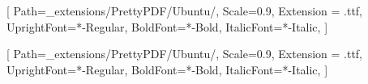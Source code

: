 \usepackage{geometry}
\usepackage{xcolor}
\usepackage{eso-pic}
\usepackage{fancyhdr, lastpage}
\usepackage{sectsty}
\usepackage{fontspec}
\usepackage{titlesec}
\usepackage[short,nodayofweek]{datetime}




\setlength{\footskip}{20pt}

\chapterfont{\color{dark}\fontsize{20}{16.8}\selectfont}
\sectionfont{\color{dark}\fontsize{20}{16.8}\selectfont}
\subsectionfont{\color{dark}\fontsize{14}{16.8}\selectfont}

\setsansfont{Ubuntu}[
    Path=_extensions/PrettyPDF/Ubuntu/,
    Scale=0.9,
    Extension = .ttf,
    UprightFont=*-Regular,
    BoldFont=*-Bold,
    ItalicFont=*-Italic,
    ]

\setmainfont{Ubuntu}[
    Path=_extensions/PrettyPDF/Ubuntu/,
    Scale=0.9,
    Extension = .ttf,
    UprightFont=*-Regular,
    BoldFont=*-Bold,
    ItalicFont=*-Italic,
    ]
